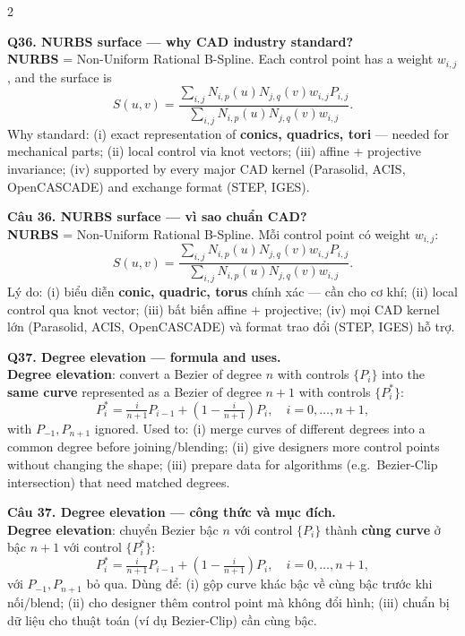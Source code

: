 \begin{paracol}{2}
\switchcolumn*

\textbf{Q36. NURBS surface — why CAD industry standard?}\\
\textbf{NURBS} = Non-Uniform Rational B-Spline. Each control point has a weight $w_{i,j}$, and the surface is
\[ S(u,v) = \frac{\sum_{i,j} N_{i,p}(u) N_{j,q}(v) w_{i,j} P_{i,j}}{\sum_{i,j} N_{i,p}(u) N_{j,q}(v) w_{i,j}}. \]
Why standard: (i) exact representation of \textbf{conics, quadrics, tori} — needed for mechanical parts; (ii) local control via knot vectors; (iii) affine + projective invariance; (iv) supported by every major CAD kernel (Parasolid, ACIS, OpenCASCADE) and exchange format (STEP, IGES).

\switchcolumn

\textbf{Câu 36. NURBS surface — vì sao chuẩn CAD?}\\
\textbf{NURBS} = Non-Uniform Rational B-Spline. Mỗi control point có weight $w_{i,j}$:
\[ S(u,v) = \frac{\sum_{i,j} N_{i,p}(u) N_{j,q}(v) w_{i,j} P_{i,j}}{\sum_{i,j} N_{i,p}(u) N_{j,q}(v) w_{i,j}}. \]
Lý do: (i) biểu diễn \textbf{conic, quadric, torus} chính xác — cần cho cơ khí; (ii) local control qua knot vector; (iii) bất biến affine + projective; (iv) mọi CAD kernel lớn (Parasolid, ACIS, OpenCASCADE) và format trao đổi (STEP, IGES) hỗ trợ.

\switchcolumn*

\textbf{Q37. Degree elevation — formula and uses.}\\
\textbf{Degree elevation}: convert a Bezier of degree $n$ with controls $\{P_i\}$ into the \textbf{same curve} represented as a Bezier of degree $n+1$ with controls $\{P_i^*\}$:
\[ P_i^* = \tfrac{i}{n+1} P_{i-1} + \left(1-\tfrac{i}{n+1}\right) P_i, \quad i=0,\ldots,n+1, \]
with $P_{-1}, P_{n+1}$ ignored. Used to: (i) merge curves of different degrees into a common degree before joining/blending; (ii) give designers more control points without changing the shape; (iii) prepare data for algorithms (e.g.\ Bezier-Clip intersection) that need matched degrees.

\switchcolumn

\textbf{Câu 37. Degree elevation — công thức và mục đích.}\\
\textbf{Degree elevation}: chuyển Bezier bậc $n$ với control $\{P_i\}$ thành \textbf{cùng curve} ở bậc $n+1$ với control $\{P_i^*\}$:
\[ P_i^* = \tfrac{i}{n+1} P_{i-1} + \left(1-\tfrac{i}{n+1}\right) P_i, \quad i=0,\ldots,n+1, \]
với $P_{-1}, P_{n+1}$ bỏ qua. Dùng để: (i) gộp curve khác bậc về cùng bậc trước khi nối/blend; (ii) cho designer thêm control point mà không đổi hình; (iii) chuẩn bị dữ liệu cho thuật toán (ví dụ Bezier-Clip) cần cùng bậc.


\end{paracol}
